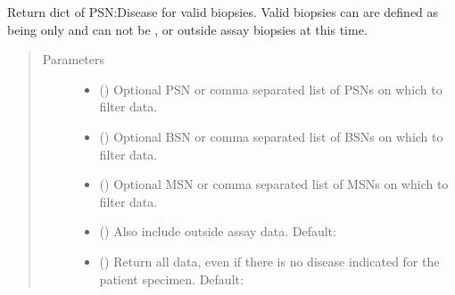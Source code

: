 \documentclass[letterpaper,10pt,english]{sphinxmanual}
\begin{document}
\begin{fulllineitems}
\begin{fulllineitems}
\label{\detokenize{matchbox_api_utils:matchbox_api_utils.match_data.MatchData.get_histology}}
Return dict of PSN:Disease for valid biopsies.  Valid biopsies can
are defined as being only  and can not be ,  or
outside assay biopsies at this time.
\begin{quote}\begin{description}
\item[{Parameters}] \leavevmode\begin{itemize}
\item {} 
 () \textendash{} Optional PSN or comma separated list of PSNs on which
to filter data.

\item {} 
 () \textendash{} Optional BSN or comma separated list of BSNs on which
to filter data.

\item {} 
 () \textendash{} Optional MSN or comma separated list of MSNs on which
to filter data.

\item {} 
 () \textendash{} Also include outside assay data. Default: 

\item {} 
 () \textendash{} Return all data, even if there is no disease
indicated for the patient specimen. Default: 

\end{itemize}


\end{description}
\end{quote}
\end{fulllineitems}
\end{fulllineitems}
\end{document}
